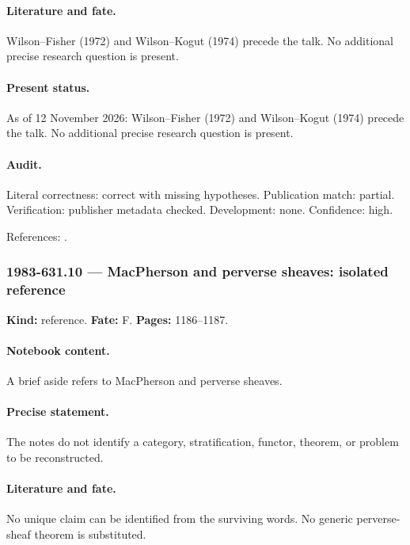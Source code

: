 \paragraph{Literature and fate.} Wilson--Fisher (1972) and Wilson--Kogut (1974) precede the talk. No additional precise research question is present.

\paragraph{Present status.} As of 12 November 2026: Wilson--Fisher (1972) and Wilson--Kogut (1974) precede the talk. No additional precise research question is present.

\paragraph{Audit.} Literal correctness: correct with missing hypotheses. Publication match: partial. Verification: publisher metadata checked. Development: none. Confidence: high.

\noindent References: \citep{wilsonfisher1972critical,wilsonkogut1974renormalization}.\par

\subsubsection{1983-631.10 --- MacPherson and perverse sheaves: isolated reference}

\label{item:1983-631.10}

\noindent\textbf{Kind:} reference. \textbf{Fate:} F. \textbf{Pages:} 1186--1187.\par

\paragraph{Notebook content.} A brief aside refers to MacPherson and perverse sheaves.

\paragraph{Precise statement.} The notes do not identify a category, stratification, functor, theorem, or problem to be reconstructed.

\paragraph{Literature and fate.} No unique claim can be identified from the surviving words. No generic perverse-sheaf theorem is substituted.

